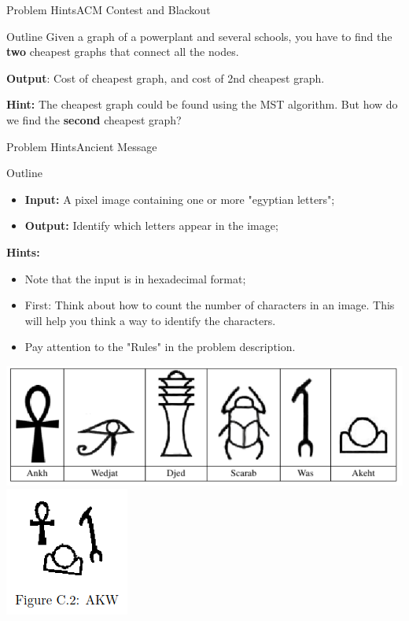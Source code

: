 \begin{frame}{Problem Hints}{ACM Contest and Blackout}
    \begin{block}{Outline}
      Given a graph of a powerplant and several schools, you have to find the {\bf two} cheapest graphs that connect all the nodes.\bigskip

      {\bf Output}: Cost of cheapest graph, and cost of 2nd cheapest graph.
    \end{block}\bigskip

    {\bf Hint:} The cheapest graph could be found using the MST algorithm. But how do we find the {\bf second} cheapest graph?
\end{frame}

\begin{frame}{Problem Hints}{Ancient Message}
  \begin{block}{Outline}
    \begin{itemize}
      \item {\bf Input:} A pixel image containing one or more "egyptian letters";
      \item {\bf Output:} Identify which letters appear in the image;
    \end{itemize}
  \end{block}

  {\bf Hints:}
  \begin{itemize}
    \item Note that the input is in hexadecimal format;
    \item First: Think about how to count the number of characters in an image. This will help you think a way to identify the characters.
    \item Pay attention to the "Rules" in the problem description.
  \end{itemize}

  \begin{center}
  \includegraphics[height=.25\textheight]{img/ancient_messages_letters.png}\hspace{1cm}
  \includegraphics[height=.25\textheight]{img/ancient_messages_example.png}
  \end{center}
\end{frame}
